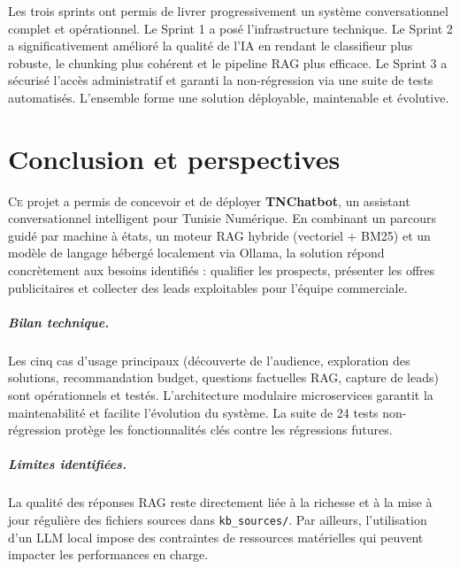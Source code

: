 \documentclass[12pt,a4paper]{report}
\begin{document}
Les trois sprints ont permis de livrer progressivement un système conversationnel
complet et opérationnel. Le Sprint 1 a posé l'infrastructure technique. Le Sprint 2 a
significativement amélioré la qualité de l'IA en rendant le classifieur plus robuste,
le chunking plus cohérent et le pipeline RAG plus efficace. Le Sprint 3 a sécurisé
l'accès administratif et garanti la non-régression via une suite de tests automatisés.
L'ensemble forme une solution déployable, maintenable et évolutive.

\chapter*{Conclusion et perspectives}

\lettrine[lines=2]{C}{e} projet a permis de concevoir et de déployer \textbf{TNChatbot},
un assistant conversationnel intelligent pour Tunisie Numérique. En combinant un parcours
guidé par machine à états, un moteur RAG hybride (vectoriel + BM25) et un modèle de
langage hébergé localement via Ollama, la solution répond concrètement aux besoins
identifiés : qualifier les prospects, présenter les offres publicitaires et collecter des leads
exploitables pour l'équipe commerciale.

\paragraph{Bilan technique.}
Les cinq cas d'usage principaux (découverte de l'audience, exploration des solutions,
recommandation budget, questions factuelles RAG, capture de leads) sont opérationnels
et testés. L'architecture modulaire microservices garantit la maintenabilité et facilite
l'évolution du système. La suite de 24 tests non-régression protège les fonctionnalités
clés contre les régressions futures.

\paragraph{Limites identifiées.}
La qualité des réponses RAG reste directement liée à la richesse et à la mise à jour
régulière des fichiers sources dans \texttt{kb\_sources/}. Par ailleurs, l'utilisation d'un
LLM local impose des contraintes de ressources matérielles qui peuvent impacter les
performances en charge.
\end{document}
